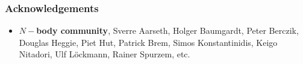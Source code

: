 
\begin{frame}
    \frametitle{Acknowledgements}

    \begin{itemize}
        \item {\bf $N-$body community},
                Sverre Aarseth,
                Holger Baumgardt,
                Peter Berczik,
                Douglas Heggie,
                Piet Hut,
                Patrick Brem,
                Simos Konstantinidis,
                Keigo Nitadori,
                Ulf L{\"o}ckmann,
                Rainer Spurzem, etc.

    \end{itemize}

\end{frame}
